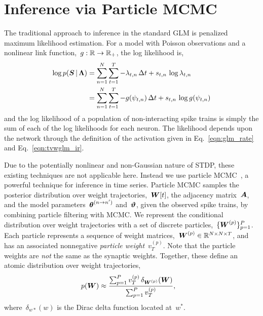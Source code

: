 \section{Inference via Particle MCMC}
The traditional approach to inference in the standard GLM is penalized
maximum likelihood estimation. For a model with Poisson observations 
and a nonlinear link function,~${g: \mathbb{R} \to \mathbb{R}_+}$, the 
log likelihood is,
\begin{align}
\label{eqn:glm_lkhd}
\log p(\boldsymbol{S} \,|\, \boldsymbol{\Lambda}) 
  &= 
    \sum_{n=1}^N \sum_{t=1}^T  -\lambda_{t,n} \, \Delta t
    + s_{t,n} \, \log \lambda_{t,n}  \\
  &= \sum_{n=1}^N \sum_{t=1}^T  -g(\psi_{t,n}) \, \Delta t
    + s_{t,n} \, \log g(\psi_{t,n}) 
\end{align}
and the log likelihood of a population of non-interacting spike trains
is simply the sum of each of the log likelihoods for each neuron. The
likelihood depends upon the network 
through the definition of the activation given
in Eq.~\ref{eqn:glm_rate} and Eq.~\ref{eqn:tvwglm_ir}. 

Due to the potentially nonlinear and non-Gaussian nature of STDP,
these existing techniques are not applicable here. Instead we use
particle MCMC~\citep{Andrieu-2010}, a powerful technique for inference
in time series. Particle MCMC samples the posterior distribution over
weight trajectories,~$\boldsymbol{W}[t]$, the adjacency matrix~$\boldsymbol{A}$, and the
model parameters~$\boldsymbol{\theta}^{(n \to n')}$ and~$\boldsymbol{\vartheta}$, given the
observed spike trains, by combining particle filtering with MCMC.  We
represent the conditional distribution over weight trajectories with a
set of discrete particles,~${\{\boldsymbol{W}^{(p)}\}_{p=1}^P}$. Each particle
represents a sequence of weight
matrices,~$\boldsymbol{W}^{(p)} \in \mathbb{R}^{N \times N \times T}$, and has an
associated nonnegative \emph{particle weight}~$v_T^{(p)}$. Note that the particle
weights are \emph{not} the same as the synaptic weights. Together,
these define an atomic distribution over weight trajectories,
\begin{align}
p(\boldsymbol{W}) &\approx \frac{\sum_{p=1}^P v_T^{(p)} \, \delta_{\boldsymbol{W}^{(p)}} (\boldsymbol{W})}
         {\sum_{p=1}^P v_T^{(p)}},
\end{align}
where~$\delta_{w*}(w)$ is the Dirac delta function located at~$w^*$.


